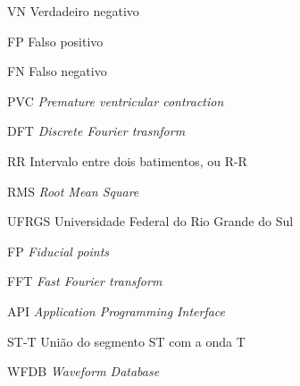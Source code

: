 \begin{siglas}
    \item[VN] Verdadeiro negativo
    \item[FP] Falso positivo
    \item[FN] Falso negativo
    \item[PVC] \emph{Premature ventricular contraction}
    \item[DFT] \emph{Discrete Fourier trasnform}
    \item[RR] Intervalo entre dois batimentos, ou R-R
    \item[RMS] \emph{Root Mean Square}
    \item[UFRGS] Universidade Federal do Rio Grande do Sul
    \item[FP] \emph{Fiducial points}
    \item[FFT] \emph{Fast Fourier transform}
    \item[API] \emph{Application Programming Interface}
    \item[ST-T] União do segmento ST com a onda T
    \item[WFDB] \emph{Waveform Database}
\end{siglas}